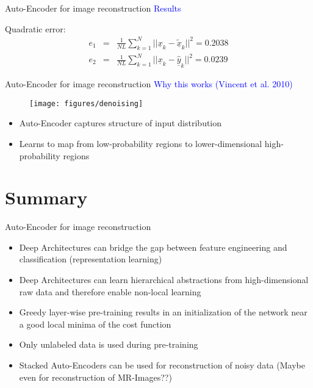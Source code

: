 	\begin{frame}[t]{Auto-Encoder for image reconstruction}
	\textcolor{blue}{\Large Results}	
	
	\begin{minipage}[t]{0.48\linewidth}
		\begin{figure}
		\end{figure}
	\end{minipage}\hfill
	\begin{minipage}[t]{0.48\linewidth}
		\begin{figure}
		\end{figure}		
	\end{minipage}
		
	Quadratic error:
	\begin{eqnarray}
		e_1 &=& \frac{1}{NL} \sum_{k = 1}^N ||\underline{x}_k - \tilde{\underline{x}}_k ||^2 = 0.2038 \nonumber \\
		e_2 &=& \frac{1}{NL} \sum_{k = 1}^N || \underline{x}_k - \hat{\underline{y}}_k ||^2 = 0.0239 \nonumber 
	\end{eqnarray}		
		
	\end{frame}
	
	\begin{frame}[t]{Auto-Encoder for image reconstruction}
		\textcolor{blue}{\Large Why this works (Vincent et al. 2010)}	
		\begin{figure}
			\texttt{[image: figures/denoising]}
		\end{figure}
		\begin{itemize}
			\item Auto-Encoder captures structure of input distribution
			\item Learns to map from low-probability regions to lower-dimensional
				high-probability regions
		\end{itemize}
	\end{frame}
	
\section{Summary}
	\begin{frame}[t]{Auto-Encoder for image reconstruction}
	\begin{itemize}
		\item Deep Architectures can bridge the gap between feature engineering and
			classification (representation learning)
		\item Deep Architectures can learn hierarchical abstractions from high-dimensional
			raw data and therefore enable non-local learning
		\item Greedy layer-wise pre-training results in an initialization of the network
			near a good local minima of the cost function
		\item Only unlabeled data is used during pre-training
		\item Stacked Auto-Encoders can be used for reconstruction of noisy data
			(Maybe even for reconstruction of MR-Images??)
	\end{itemize}	
	\end{frame}


